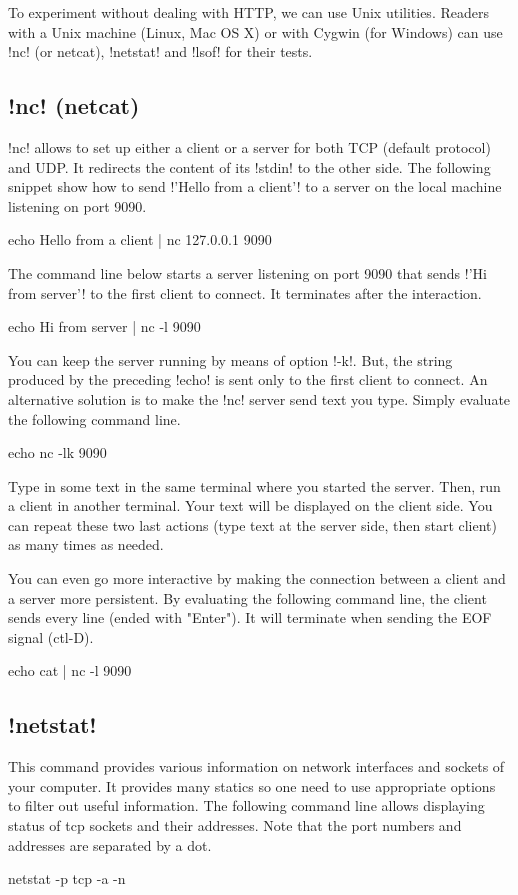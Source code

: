 \documentclass[a4paper,10pt,twoside]{book}
\begin{document}
To experiment without dealing with HTTP, we can use Unix utilities.
Readers with a Unix machine (Linux, Mac OS X) or with Cygwin (for Windows) can use \ct!nc! (or netcat), \ct!netstat! and \ct!lsof! for their tests.

\subsection{\ct!nc! (netcat)}
\ct!nc! allows to set up either a client or a server for both TCP (default protocol) and UDP.
It redirects the content of its \ct!stdin! to the other side.
The following snippet show how to send \ct!'Hello from a client'! to a server on the local machine listening on port 9090.
\begin{code}{}
echo Hello from a client | nc 127.0.0.1 9090 
\end{code}

The command line below starts a server listening on port 9090 that sends \ct!'Hi from server'! to the first client to connect.
It terminates after the interaction.
\begin{code}{}
echo Hi from server | nc -l 9090 
\end{code}

You can keep the server running by means of option \ct!-k!.
But, the string produced by the preceding \ct!echo! is sent only to the first client to connect.
An alternative solution is to make the \ct!nc! server send text you type.
Simply evaluate the following command line. 
\begin{code}{}
echo nc -lk 9090 
\end{code}

Type in some text in the same terminal where you started the server.
Then, run a client in another terminal.
Your text will be displayed on the client side.
You can repeat these two last actions (type text at the server side, then start client) as many times as needed.

You can even go more interactive by making the connection between a client and a server more persistent.
By evaluating the following command line, the client sends every line (ended with "Enter").
It will terminate when sending the EOF signal (ctl-D).
\begin{code}{}
echo cat | nc -l 9090 
\end{code}


\subsection{\ct!netstat!}
This command provides various information on network interfaces and sockets of your computer.
It provides many statics so one need to use appropriate options to filter out useful information.
The following command line allows displaying status of tcp sockets and their addresses.
Note that the port numbers and addresses are separated by a dot.
\begin{code}{}
netstat -p tcp -a -n
\end{code}
 
\end{document}
